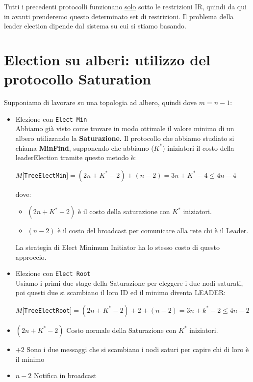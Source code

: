 Tutti i precedenti protocolli funzionano \underline{solo} sotto le restrizioni IR,
quindi da qui in avanti prenderemo questo determinato set di restrizioni. Il
problema della leader election dipende dal sistema su cui si stiamo basando.

\section{Election su alberi: utilizzo del protocollo Saturation}
Supponiamo di lavorare su una topologia ad albero, quindi dove $m = n-1$:

\begin{itemize}
    \item Elezione con \texttt{Elect Min}\\
          Abbiamo già visto come trovare in modo ottimale il valore minimo di un
          albero utilizzando la \textbf{Saturazione.} Il protocollo che abbiamo
          studiato si chiama \textbf{MinFind}, supponendo che abbiamo ($K^*$)
          iniziatori il costo della leaderElection tramite questo metodo è:
          \begin{center}
              $M[$\texttt{TreeElectMin}$] = (2n + K^* -2) + (n-2) = 3n + K^* - 4
                  \leq 4n - 4$
          \end{center}
          dove:
          \begin{itemize}
              \item $(2n + K^* -2)$ è il costo della saturazione con $K^*$
                    iniziatori.
              \item $(n-2)$ è il costo del broadcast per comunicare alla rete chi è
                    il Leader.
          \end{itemize}

          La strategia di Elect Minimum Initiator ha lo stesso costo di questo
          approccio.
    \item Elezione con \texttt{Elect Root}\\
          Usiamo i primi due stage della Saturazione per eleggere i due nodi
          saturati, poi questi due si scambiano il loro ID ed il minimo diventa
          LEADER:
          \begin{center}
              $M[$\texttt{TreeElectRoot}$] = (2n + K^* -2) +2 + (n-2) = 3n + k^* - 2
                  \leq 4n - 2$
          \end{center}
\end{itemize}
\begin{itemize}
    \item $(2n + K^* -2)$ Costo normale della Saturazione con $K^*$ iniziatori.
    \item $+2$ Sono i due messaggi che si scambiano i nodi saturi per capire chi
          di loro è il minimo
    \item $n-2$ Notifica in broadcast
\end{itemize}



